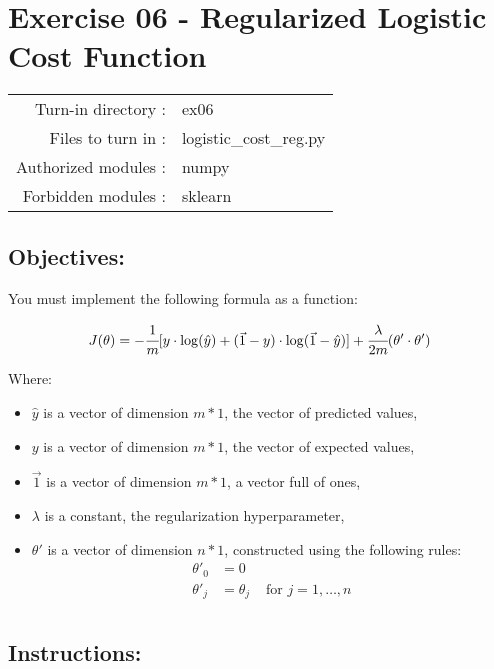 \documentclass[]{article}
\begin{document}
\clearpage

\hypertarget{exercise-06---regularized-logistic-cost-function-1}{%
\section{Exercise 06 - Regularized Logistic Cost
Function}\label{exercise-06---regularized-logistic-cost-function-1}}

\begin{longtable}[]{@{}rl@{}}
\toprule
\endhead
Turn-in directory : & ex06\tabularnewline
Files to turn in : & logistic\_cost\_reg.py\tabularnewline
Authorized modules : & numpy\tabularnewline
Forbidden modules : & sklearn\tabularnewline
\bottomrule
\end{longtable}

\hypertarget{objectives-5}{%
\subsection{Objectives:}\label{objectives-5}}

You must implement the following formula as a function:

\large

\[
J( \theta) = -\cfrac{1} {m} \lbrack y \cdot \log(\hat{y}) + (\vec{1} - y) \cdot \log(\vec{1} - \hat{y})\rbrack + \cfrac{\lambda}{2m} (\theta' \cdot \theta')
\] \normalsize

Where:

\begin{itemize}
\item
  \(\hat{y}\) is a vector of dimension \(m * 1\), the vector of
  predicted values,
\item
  \(y\) is a vector of dimension \(m * 1\), the vector of expected
  values,
\item
  \(\vec{1}\) is a vector of dimension \(m * 1\), a vector full of ones,
\item
  \(\lambda\) is a constant, the regularization hyperparameter,
\item
  \(\theta'\) is a vector of dimension \(n * 1\), constructed using the
  following rules: \large \[
  \begin{matrix}
  \theta'_0 & =  0 \\
  \theta'_j & =  \theta_j & \text{ for } j = 1, \dots, n\\    
  \end{matrix}
  \] \normalsize
\end{itemize}

\hypertarget{instructions-5}{%
\subsection{Instructions:}\label{instructions-5}}
\end{document}
